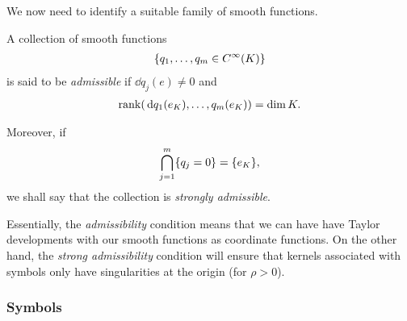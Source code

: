 We now need to identify a suitable family of smooth functions.

\begin{definition}[Admissibility]
    A collection of smooth functions
    \begin{align*}
        \{q_1, \dots, q_m \in {C^\infty(K)}\}
    \end{align*}
    is said to be \emph{admissible}
    if $\dd q_j(e) \neq 0$ and
    \begin{align*}
        \operatorname{rank}(\,\mathrm{d} q_1(e_K), \dots, q_m(e_K))
        = \dim K.
    \end{align*}

    Moreover, if
    \begin{align*}
        \bigcap_{j = 1}^m \{q_j = 0\} = \{e_K\},
    \end{align*}
    we shall say that the collection is \emph{strongly admissible}.
\end{definition}

Essentially, the \emph{admissibility} condition means
that we can have have Taylor developments with our smooth functions as coordinate functions.
On the other hand, the \emph{strong admissibility} condition will ensure
that kernels associated with symbols only have singularities at the origin (for $\rho > 0$).

\subsubsection{Symbols}

